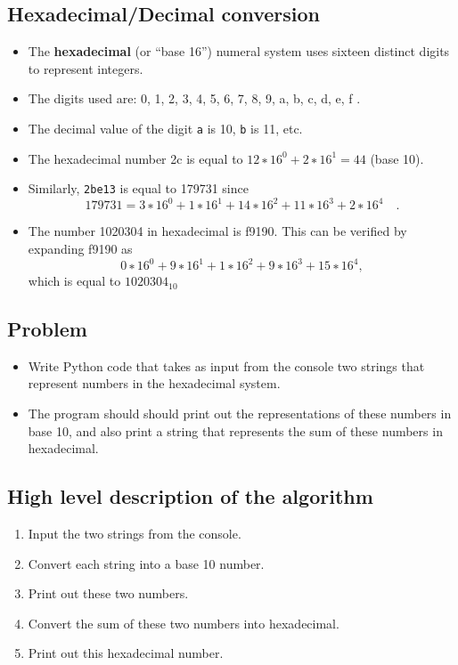 \documentclass[]{tufte-handout}
\providecommand{\tightlist}{%
  \setlength{\itemsep}{0pt}\setlength{\parskip}{0pt}}
\begin{document}
\subsection{Hexadecimal/Decimal
conversion}\label{hexadecimaldecimal-conversion}

\begin{itemize}
\tightlist
\item
  The \textbf{hexadecimal} (or ``base 16'') numeral system uses sixteen
  distinct digits to represent integers.
\item
  The digits used are: 0, 1, 2, 3, 4, 5, 6, 7, 8, 9, a, b, c, d, e, f .
\item
  The decimal value of the digit \texttt{a} is 10, \texttt{b} is 11,
  etc.
\item
  The hexadecimal number 2c is equal to \(12 ∗ 16^0 + 2 ∗ 16^1 = 44\)
  (base 10).
\item
  Similarly, \texttt{2be13} is equal to 179731 since \[
  179731 = 3 ∗ 16^0 + 1 ∗ 16^1 + 14 ∗ 16^2 + 11 ∗ 16^3 + 2 ∗ 16^4 \quad.
  \]
\item
  The number 1020304 in hexadecimal is f9190. This can be verified by
  expanding f9190 as \[
  0 ∗ 16^0 + 9 ∗ 16^1 + 1 ∗ 16^2 + 9 ∗ 16^3 + 15 ∗ 16^4 ,
  \] which is equal to \(1020304_{10}\)
\end{itemize}

\subsection{Problem}\label{problem}

\begin{itemize}
\tightlist
\item
  Write Python code that takes as input from the console two strings
  that represent numbers in the hexadecimal system.
\item
  The program should should print out the representations of these
  numbers in base 10, and also print a string that represents the sum of
  these numbers in hexadecimal.
\end{itemize}

\subsection{High level description of the
algorithm}\label{high-level-description-of-the-algorithm}

\begin{enumerate}
\def\labelenumi{\arabic{enumi}.}
\tightlist
\item
  Input the two strings from the console.
\item
  Convert each string into a base 10 number.
\item
  Print out these two numbers.
\item
  Convert the sum of these two numbers into hexadecimal.
\item
  Print out this hexadecimal number.
\end{enumerate}
\end{document}
